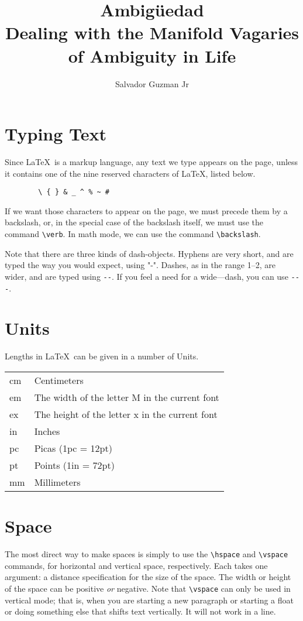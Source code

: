 \documentclass[UTF8]{article}
\title{%
	Ambigüedad\\
	\large Dealing with the Manifold Vagaries of Ambiguity in Life
}
\author{Salvador Guzman Jr}
\begin{document}
	\maketitle
	\tableofcontents
	
	\section{Typing Text}
	Since \LaTeX\ is a markup language, any text we
	type appears on the page, unless it contains
	one of the nine reserved characters of \LaTeX, listed
	below.
	\begin{verbatim}
		\ { } & _ ^ % ~ #
	\end{verbatim}
	If we want those characters to appear on the page, we
	must precede them by a backslash, or, in the special
	case of the backslash itself, we must use the 
	command \verb(\verb(.  In math mode, we can use the command
	\verb(\backslash(.
	
	Note that there are three kinds of dash-objects.  Hyphens 
	are very short, and are typed the way you would expect, using
	"-".  Dashes, as in the range 1--2, are wider, and are typed
	using \verb+--+.  If you feel a need for a wide---dash, you can
	use \verb+---+.
	
	\section{Units}
	Lengths in \LaTeX\ can be given in a number of Units.\\
	\begin{tabular}{ll}
		cm & Centimeters\\
		em & The width of the letter M in the current font\\
		ex & The height of the letter x in the current font\\
		in & Inches\\
		pc & Picas (1pc = 12pt)\\
		pt & Points (1in = 72pt)\\
		mm & Millimeters
	\end{tabular}
	
	\section{Space}
	The most direct way to make spaces is simply to use the
	\verb(\hspace( and \verb(\vspace( commands, for horizontal
	and vertical space, respectively.  Each takes one
	argument: a distance specification for the size of the space.
	The width or height of the space can be positive {\em or}
	negative.  Note that \verb(\vspace( can only be used in 
	vertical mode; that is, when you are starting a new paragraph
	or starting a float or doing something else that shifts text
	vertically.  It will not work in a line.
	
\end{document}
